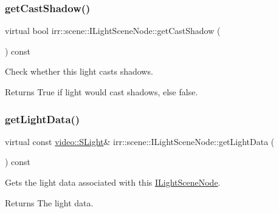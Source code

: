 \subsubsection{\texorpdfstring{get\+Cast\+Shadow()}{getCastShadow()}\hspace{0.1cm}{\footnotesize\ttfamily [2/2]}}
{\footnotesize\ttfamily virtual bool irr\+::scene\+::\+I\+Light\+Scene\+Node\+::get\+Cast\+Shadow (\begin{DoxyParamCaption}{ }\end{DoxyParamCaption}) const\hspace{0.3cm}{\ttfamily [pure virtual]}}



Check whether this light casts shadows. 

\begin{DoxyReturn}{Returns}
True if light would cast shadows, else false. 
\end{DoxyReturn}
\mbox{\label{classirr_1_1scene_1_1ILightSceneNode_a687813feae9312a86882e12c2bd10194}} 
\subsubsection{\texorpdfstring{get\+Light\+Data()}{getLightData()}\hspace{0.1cm}{\footnotesize\ttfamily [1/4]}}
{\footnotesize\ttfamily virtual const \hyperlink{structirr_1_1video_1_1SLight}{video\+::\+S\+Light}\& irr\+::scene\+::\+I\+Light\+Scene\+Node\+::get\+Light\+Data (\begin{DoxyParamCaption}{ }\end{DoxyParamCaption}) const\hspace{0.3cm}{\ttfamily [pure virtual]}}



Gets the light data associated with this \hyperlink{classirr_1_1scene_1_1ILightSceneNode}{I\+Light\+Scene\+Node}. 

\begin{DoxyReturn}{Returns}
The light data. 
\end{DoxyReturn}
\mbox{\label{classirr_1_1scene_1_1ILightSceneNode_a687813feae9312a86882e12c2bd10194}} 
